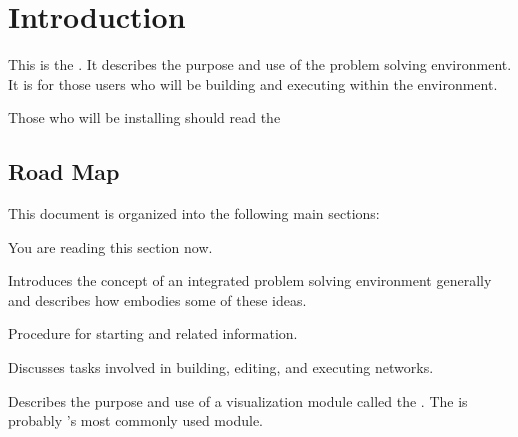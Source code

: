 %

\section{Introduction}
\label{sec:intro}


This is the \etitle{\srug}.  It describes the purpose and use of the \sr{}
problem solving environment.  It is for those users who will be building
and executing  within the \sr{} environment.

Those who will be installing \sr{} should read the




\subsection{Road Map}
\label{sec:roadmap}

This document is organized into the following main sections:

\begin{description}
\item {} You are reading this section now.
\item {} Introduces the concept of an
  integrated problem solving environment generally and describes how \SR{}
  embodies some of these ideas.
\item {}  Procedure for starting \sr{}
  and related information.
\item {} Discusses tasks involved in
  building, editing, and executing networks.
\item {} Describes the
  purpose and use of a visualization module called the \viewer{}.  The
  \viewer{} is probably \sr{}'s most commonly used module.
\end{description}

